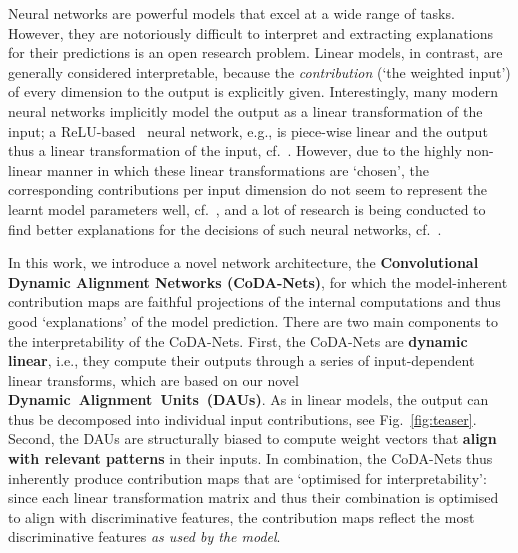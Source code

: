 
Neural networks are powerful models that excel at a wide range of tasks.
However, they are notoriously difficult to interpret and extracting explanations 
    for their predictions is an open research problem. Linear models, in contrast, are generally considered interpretable, because
    the \emph{contribution} 
    (`the weighted input') of every dimension to the output is explicitly given.
Interestingly, many modern neural networks implicitly model the output as a linear transformation of the input;
    a ReLU-based~\cite{nair2010rectified} neural network, e.g.,
    is piece-wise linear and the output thus a linear transformation of the input, cf.~\cite{montufar2014number}.
    However, due to the highly non-linear manner in which these linear transformations are `chosen', the corresponding contributions per input dimension do not seem to represent the learnt model parameters well, cf.~\cite{adebayo2018sanity}, and a lot of research is being conducted to find better explanations for the decisions of such neural networks, cf.~\cite{simonyan2013deep,springenberg2014striving,zhou2016CAM,selvaraju2017grad,shrikumar2017deeplift,sundararajan2017axiomatic,srinivas2019full,bach2015pixel}.
    
In this work, we introduce a novel network architecture, the \textbf{Convolutional Dynamic Alignment Networks (CoDA-Nets)}, {for which the model-inherent contribution maps are faithful projections of the internal computations and thus good `explanations' of the model prediction.} 
There are two main components to the interpretability of the CoDA-Nets. 
    First, the CoDA-Nets are \textbf{dynamic linear}, i.e., they compute their outputs through a series of input-dependent linear transforms, which are based on our novel \mbox{\textbf{Dynamic Alignment Units (DAUs)}}. 
        As in linear models, the output can thus be decomposed into individual input contributions, see Fig.~\ref{fig:teaser}.
    Second, the DAUs are structurally biased to compute weight vectors that \textbf{align with \mbox{relevant} patterns} in their inputs. 
In combination, the CoDA-Nets thus inherently  
produce contribution maps that are `optimised for interpretability': 
since each linear transformation matrix and thus their combination is optimised to align with discriminative features, the contribution maps reflect the most discriminative features \emph{as used by the model}.

